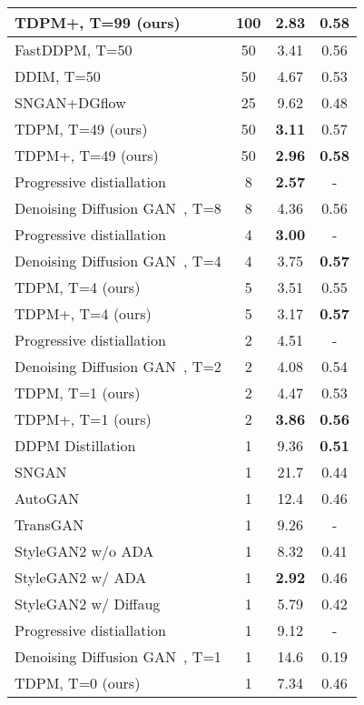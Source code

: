 \documentclass{article} \usepackage{iclr2023_conference,times}
\theoremstyle{plain}
\theoremstyle{definition}
\theoremstyle{remark}
\begin{document}
{\begin{table}[ht]
{\begin{tabular}{lccc}
\rowcolor{Gray}
TDPM+, T=99 (ours) &100   & 2.83& 0.58\\
\midrule
FastDDPM, T=50 \citep{kong2021fast} & 50 & 3.41 & 0.56 \\
DDIM, T=50 \citep{ddim} & 50   & 4.67& 0.53 \\
SNGAN+DGflow \citep{ansari2021refining} & 25 & 9.62& 0.48 \\
\rowcolor{Gray}
TDPM, T=49 (ours) &50  & \textbf{3.11}& {0.57} \\
\rowcolor{Gray}
TDPM+, T=49 (ours) &50  & \textbf{2.96}& \textbf{0.58} \\
\midrule
{Progressive distiallation~\citep{salimans2022progressive}} &8 & \textbf{2.57}& - \\
{Denoising Diffusion GAN~\citep{xiao2021tackling}}, T=8 &8  & 4.36& {0.56} \\ \hdashline
{Progressive distiallation~\citep{salimans2022progressive}} &4  & \textbf{3.00}& - \\
{Denoising Diffusion GAN~\citep{xiao2021tackling}}, T=4 &4  & 3.75& \textbf{0.57} \\
\rowcolor{Gray}
TDPM, T=4 (ours) &5  & {3.51}& {0.55}\\
\rowcolor{Gray}
TDPM+, T=4 (ours) &5  & {3.17}& \textbf{0.57}\\\hdashline
{Progressive distiallation~\citep{salimans2022progressive}} &2 & 4.51& - \\
{Denoising Diffusion GAN~\citep{xiao2021tackling}}, T=2 &2 & 4.08& 0.54 \\
\rowcolor{Gray}
TDPM, T=1 (ours) &2  & {4.47} & {0.53} \\
\rowcolor{Gray}
TDPM+, T=1 (ours) &2  & \textbf{3.86} & \textbf{0.56} \\
\hdashline
DDPM Distillation \citep{luhman2021knowledge} &1   & 9.36& \textbf{0.51} \\
SNGAN \citep{miyato2018spectral} &1  & 21.7 & 0.44 \\ 
AutoGAN \citep{gong2019autogan} &1   & 12.4 &0.46 \\ 
TransGAN \citep{jiang2021transgan} &1 &9.26&-\\
StyleGAN2 w/o ADA \citep{karras2020training} &1   & 8.32& 0.41\\
StyleGAN2 w/ ADA \citep{karras2020training} &1  & \textbf{2.92}& 0.46\\
StyleGAN2 w/ Diffaug \citep{zhao2020differentiable} &1 & 5.79& 0.42 \\
{Progressive distiallation~\citep{salimans2022progressive}}&1& 9.12& -  \\
{Denoising Diffusion GAN~\citep{xiao2021tackling}}, T=1 &1  & 14.6& {0.19} \\
\rowcolor{Gray}
TDPM, T=0 (ours) &1  & 7.34 & 0.46\\
\bottomrule[1.5pt]
\end{tabular}
}
\vspace{-4mm}
\end{table}



}
\end{document}
